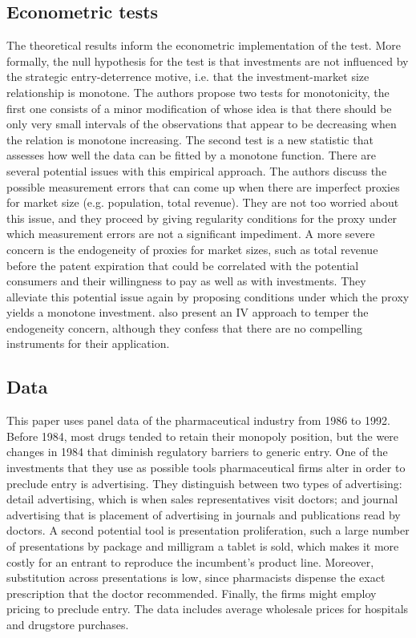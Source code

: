 \documentclass{article}
\theoremstyle{definition}
\begin{document}
\subsection*{Econometric tests}

The theoretical results inform the econometric implementation of the test. More formally, the null hypothesis for the test is that investments are not influenced by the strategic entry-deterrence motive, i.e. that the investment-market size relationship is monotone. The authors propose two tests for monotonicity, the first one consists of a minor modification of \cite{hall2000testing} whose idea is that there should be only very small intervals of the observations that appear to be decreasing when the relation is monotone increasing.  The second test is a new statistic that assesses how well the data can be fitted by a monotone function. There are several potential issues with this empirical approach. The authors discuss the possible measurement errors that can come up when there are imperfect proxies for market size (e.g. population, total revenue). They are not too worried about this issue, and they proceed by giving regularity conditions for the proxy under which measurement errors are not a significant impediment. A more severe concern is the endogeneity of proxies for market sizes, such as total revenue before the patent expiration that could be correlated with the potential consumers and their willingness to pay as well as with investments. They alleviate this potential issue again by proposing conditions under which the proxy yields a monotone investment. 
\cite{ellison2011strategic} also present an IV approach to temper the endogeneity concern, although they confess that there are no compelling instruments for their application. 

\subsection*{Data}

This paper uses panel data of the pharmaceutical industry from 1986 to 1992.  Before 1984, most drugs tended to retain their monopoly position, but the were changes in 1984 that diminish regulatory barriers to generic entry. One of the investments that they use as possible tools pharmaceutical firms alter in order to preclude entry is advertising. They distinguish between two types of advertising: detail advertising, which is when sales representatives visit doctors; and journal advertising that is placement of advertising in journals and publications read by doctors. A second potential tool is presentation proliferation, such a large number of presentations by package and milligram a tablet is sold, which makes it more costly for an entrant to reproduce the incumbent's product line. Moreover, substitution across presentations is low, since pharmacists dispense the exact prescription that the doctor recommended. Finally, the firms might employ pricing to preclude entry. The data includes average wholesale prices for hospitals and drugstore purchases. 
\end{document}
